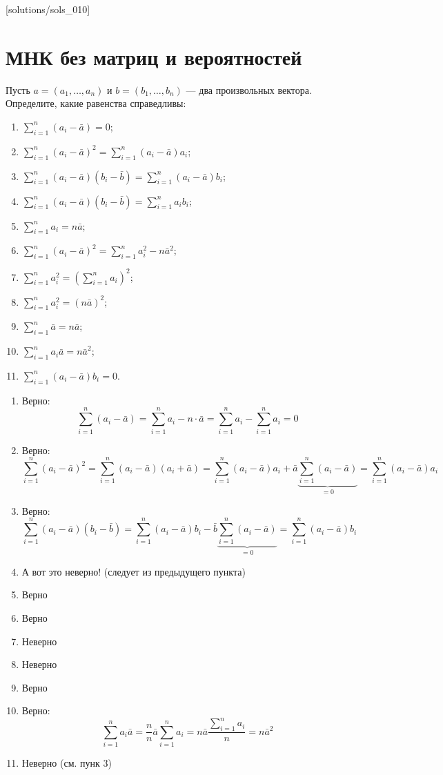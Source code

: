 [solutions/sols_010]

\chapter{МНК без матриц и вероятностей}

\begin{problem} %
Пусть $a = (a_1,\dots,a_n)$ и $b = (b_1,\dots,b_n)$ — два произвольных вектора. Определите, какие равенства справедливы:
\begin{enumerate}
\item $\sum_{i=1}^n {(a_i-\bar a)} = 0$;
\item $\sum_{i=1}^n {(a_i-\bar a)^2} = \sum_{i=1}^n {(a_i-\bar a)a_i}$;
\item $\sum_{i=1}^n {(a_i-\bar a)(b_i-\bar b)} = \sum_{i=1}^n {(a_i-\bar a)b_i}$;
\item $\sum_{i=1}^n {(a_i-\bar a)(b_i-\bar b)} = \sum_{i=1}^n {a_i b_i}$;
\item $\sum_{i=1}^n a_i = n\bar a$;
\item $\sum_{i=1}^n (a_i - \bar a)^2 = \sum_{i=1}^n a_i^2 - n \bar a^2$;
\item $\sum_{i=1}^n a_i^2 = \left( \sum_{i=1}^n a_i \right)^2$;
\item $\sum_{i=1}^n a_i^2 = (n\bar a)^2$;
\item $\sum_{i=1}^n \bar a = n \bar a$;
\item $\sum_{i=1}^n a_i \bar a = n \bar a^2$;
\item $\sum_{i=1}^n {(a_i-\bar a)b_i} = 0$.
\end{enumerate}


\begin{sol}
\begin{enumerate}
\item Верно: \[\sum_{i=1}^{n}(a_i-\bar{a}) = \sum_{i=1}^{n}a_i - n\cdot\bar{a} = \sum_{i=1}^{n}a_i - \sum_{i=1}^{n}a_i = 0\]
\item Верно: \[\sum_{i=1}^{n}(a_i-\bar{a})^2 = \sum_{i=1}^{n}(a_i-\bar{a})(a_i+\bar{a}) = \sum_{i=1}^{n}(a_i-\bar{a})a_i + \bar{a}\underbrace{\sum_{i=1}^{n}(a_i-\bar{a})}_{=0} = \sum_{i=1}^{n}(a_i-\bar{a})a_i \]

\item Верно: \[\sum_{i=1}^{n}(a_i-\bar{a})(b_i-\bar{b}) = \sum_{i=1}^{n}(a_i-\bar{a})b_i - \bar{b}\underbrace{\sum_{i=1}^{n}(a_i-\bar{a})}_{=0} = \sum_{i=1}^{n}(a_i-\bar{a})b_i \]
\item А вот это неверно! (следует из предыдущего пункта)
\item Верно
\item Верно
\item Неверно
\item Неверно
\item Верно
\item Верно: \[\sum_{i=1}^{n}a_i\bar{a} = \frac{n}{n}\bar{a}\sum_{i=1}^{n}a_i = n \bar{a} \frac{\sum_{i=1}^{n}a_i}{n} = n\bar{a}^2 \]
\item Неверно (см. пунк 3)
\end{enumerate}
\end{sol}
\end{problem}
